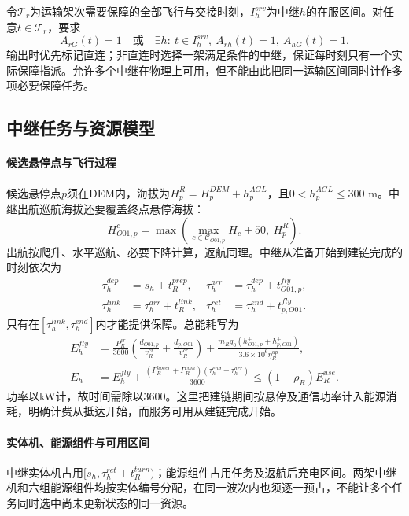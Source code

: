 令$\mathcal T_r$为运输架次需要保障的全部飞行与交接时刻，$I_h^{srv}$为中继$h$的在服区间。对任意$t\in\mathcal T_r$，要求
\begin{equation}
A_{rG}(t)=1\quad\text{或}\quad
\exists h:\ t\in I_h^{srv},\ A_{rh}(t)=1,\ A_{hG}(t)=1.
\label{eq:continuous}
\end{equation}
输出时优先标记直连；非直连时选择一架满足条件的中继，保证每时刻只有一个实际保障指派。允许多个中继在物理上可用，但不能由此把同一运输区间同时计作多项必要保障任务。

\subsection{中继任务与资源模型}
\paragraph{候选悬停点与飞行过程}
候选悬停点$p$须在DEM内，海拔为$H_p^R=H_p^{DEM}+h_p^{AGL}$，且$0<h_p^{AGL}\le300$ m。中继出航巡航海拔还要覆盖终点悬停海拔：
\begin{equation}
H_{O01,p}^{c}=\max\left(\max_{c\in\mathcal C_{O01,p}}H_c+50,\ H_p^R\right).
\end{equation}
出航按爬升、水平巡航、必要下降计算，返航同理。中继从准备开始到建链完成的时刻依次为
\begin{align}
\tau_h^{dep}&=s_h+t_R^{prep},&
\tau_h^{arr}&=\tau_h^{dep}+t_{O01,p}^{fly},\\
\tau_h^{link}&=\tau_h^{arr}+t_R^{link},&
\tau_h^{ret}&=\tau_h^{end}+t_{p,O01}^{fly}.
\end{align}
只有在$[\tau_h^{link},\tau_h^{end}]$内才能提供保障。总能耗写为
\begin{align}
E_h^{fly}&=\frac{P_R^{cr}}{3600}\left(\frac{d_{O01,p}}{v_R^{cr}}+\frac{d_{p,O01}}{v_R^{cr}}\right)
+\frac{m_Rg_0(h_{O01,p}^{+}+h_{p,O01}^{+})}{3.6\times10^6\eta_R^{up}},\\
E_h&=E_h^{fly}+\frac{(P_R^{hover}+P_R^{com})(\tau_h^{end}-\tau_h^{arr})}{3600}
\le(1-\rho_R)E_R^{use}.\label{eq:relay-energy}
\end{align}
功率以kW计，故时间需除以3600。这里把建链期间按悬停及通信功率计入能源消耗，明确计费从抵达开始，而服务可用从建链完成开始。

\paragraph{实体机、能源组件与可用区间}
中继实体机占用$[s_h,\tau_h^{ret}+t_R^{turn})$；能源组件占用任务及返航后充电区间。两架中继机和六组能源组件均按实体编号分配，在同一波次内也须逐一预占，不能让多个任务同时选中尚未更新状态的同一资源。

